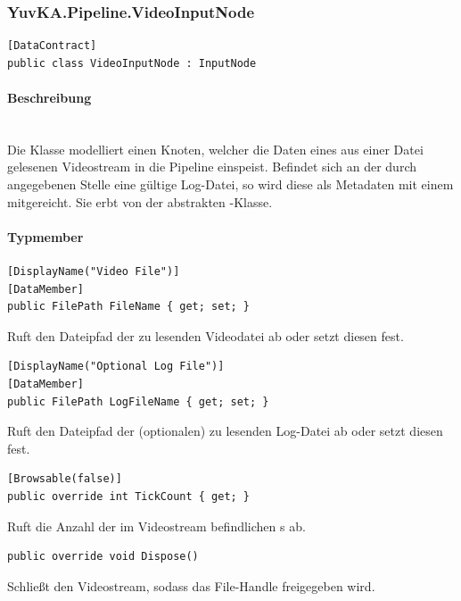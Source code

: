 \subsubsection{YuvKA.Pipeline.VideoInputNode}

\begin{verbatim}
[DataContract]
public class VideoInputNode : InputNode
\end{verbatim}

\paragraph{Beschreibung}~\\
Die Klasse  modelliert einen Knoten, welcher die Daten eines aus einer Datei gelesenen Videostream in die Pipeline einspeist. Befindet sich an der durch  angegebenen Stelle eine gültige Log-Datei, so wird diese als Metadaten mit einem  mitgereicht. Sie erbt von der abstrakten -Klasse.


\paragraph{Typmember}
\begin{itemize}

        \begin{verbatim}
[DisplayName("Video File")]
[DataMember]
public FilePath FileName { get; set; }
        \end{verbatim}
	Ruft den Dateipfad der zu lesenden Videodatei ab oder setzt diesen fest.

        \begin{verbatim}
[DisplayName("Optional Log File")]
[DataMember]
public FilePath LogFileName { get; set; }
        \end{verbatim}
	Ruft den Dateipfad der (optionalen) zu lesenden Log-Datei ab oder setzt diesen fest.

        \begin{verbatim}
[Browsable(false)]
public override int TickCount { get; }
        \end{verbatim}
	Ruft die Anzahl der im Videostream befindlichen s ab.

        \begin{verbatim}
public override void Dispose()
        \end{verbatim}
Schließt den Videostream, sodass das File-Handle freigegeben wird.


\end{itemize}
